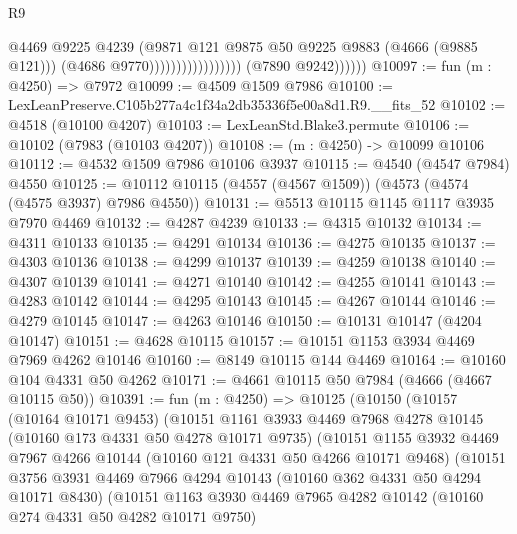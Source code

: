 \begin{lexlean}{R9}
\begin{coremodule}
                                              @4469
                                              @9225
                                              @4239
                                              (@9871
                                                @121
                                                @9875
                                                @50
                                                @9225
                                                @9883
                                                (@4666 (@9885 @121)))
                                              (@4686 @9770)))))))))))))))))
              (@7890 @9242))))))
@10097 := fun (m : @4250) => @7972
@10099 := @4509 @1509 @7986
@10100 := LexLeanPreserve.C105b277a4c1f34a2db35336f5e00a8d1.R9.__fits_52
@10102 := @4518 (@10100 @4207)
@10103 := LexLeanStd.Blake3.permute
@10106 := @10102 (@7983 (@10103 @4207))
@10108 := (m : @4250) -> @10099 @10106
@10112 := @4532 @1509 @7986 @10106 @3937
@10115 := @4540 (@4547 @7984) @4550
@10125 := @10112 @10115 (@4557 (@4567 @1509)) (@4573 (@4574 (@4575 @3937) @7986 @4550))
@10131 := @5513 @10115 @1145 @1117 @3935 @7970 @4469
@10132 := @4287 @4239
@10133 := @4315 @10132
@10134 := @4311 @10133
@10135 := @4291 @10134
@10136 := @4275 @10135
@10137 := @4303 @10136
@10138 := @4299 @10137
@10139 := @4259 @10138
@10140 := @4307 @10139
@10141 := @4271 @10140
@10142 := @4255 @10141
@10143 := @4283 @10142
@10144 := @4295 @10143
@10145 := @4267 @10144
@10146 := @4279 @10145
@10147 := @4263 @10146
@10150 := @10131 @10147 (@4204 @10147)
@10151 := @4628 @10115
@10157 := @10151 @1153 @3934 @4469 @7969 @4262 @10146
@10160 := @8149 @10115 @144 @4469
@10164 := @10160 @104 @4331 @50 @4262
@10171 := @4661 @10115 @50 @7984 (@4666 (@4667 @10115 @50))
@10391 := fun (m : @4250) =>
  @10125
    (@10150
      (@10157
        (@10164 @10171 @9453)
        (@10151
          @1161
          @3933
          @4469
          @7968
          @4278
          @10145
          (@10160 @173 @4331 @50 @4278 @10171 @9735)
          (@10151
            @1155
            @3932
            @4469
            @7967
            @4266
            @10144
            (@10160 @121 @4331 @50 @4266 @10171 @9468)
            (@10151
              @3756
              @3931
              @4469
              @7966
              @4294
              @10143
              (@10160 @362 @4331 @50 @4294 @10171 @8430)
              (@10151
                @1163
                @3930
                @4469
                @7965
                @4282
                @10142
                (@10160 @274 @4331 @50 @4282 @10171 @9750)

\end{coremodule}
\end{lexlean}
